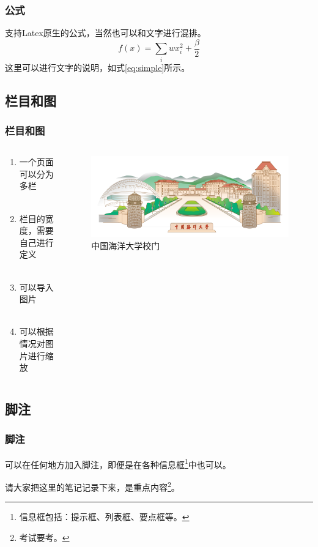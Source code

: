 \documentclass[aspectratio=169,UTF8,t]{beamer}%
\begin{document}
\begin{frame}
\frametitle{公式}
    支持Latex原生的公式，当然也可以和文字进行混排。
    \begin{equation}
        f(x) = \sum_i wx_i^2 + \frac{\beta}{2} \label{eq:simple}  
    \end{equation}
    这里可以进行文字的说明，如式\eqref{eq:simple}所示。
\end{frame}

\subsection{栏目和图}

\begin{frame}
    \frametitle{栏目和图}

    \begin{columns}
        \begin{column}{0.4\textwidth}
            \begin{enumerate}
                \item 一个页面可以分为多栏\\~
                \item 栏目的宽度，需要自己进行定义\\~
                \item 可以导入图片\\~
                \item 可以根据情况对图片进行缩放
            \end{enumerate}
        \end{column}
        \begin{column}{0.4\textwidth}
            \centering
            \begin{figure}
                \centering
                \includegraphics[width=\textwidth]{figs/ouc_gate.png}
                    \caption{中国海洋大学校门}
                    \label{fig1}
            \end{figure}
            
        \end{column}
    \end{columns}
\end{frame}

\subsection{脚注}

\begin{frame}
    \frametitle{脚注}
        可以在任何地方加入脚注，即便是在各种信息框\footnote{信息框包括：提示框、列表框、要点框等。}中也可以。
        \begin{notebox}[笔记]
            请大家把这里的笔记记录下来，是重点内容\footnote{考试要考。}。 
        \end{notebox}
\end{frame}

\makelast
\end{document}

